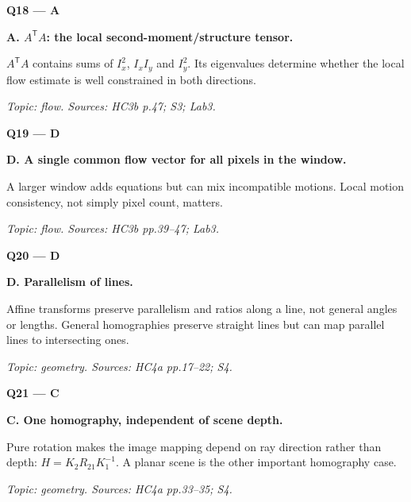 \documentclass[11pt,a4paper]{article}
\begin{document}
\par\vspace{12pt}
\begin{minipage}{\linewidth}
\textbf{Q18 — A}\par\smallskip
\textbf{A. \(A^{\mathsf T}A\): the local second-moment/\allowbreak{}structure tensor.}\par
\(A^{\mathsf T}A\) contains sums of \(I_x^2\),\allowbreak{} \(I_x I_y\) and \(I_y^2\). Its eigenvalues determine whether the local flow estimate is well constrained in both directions.\par
{\small\itshape Topic: flow. Sources: HC3b p.47; S3; Lab3.}

\end{minipage}
\par\vspace{12pt}
\begin{minipage}{\linewidth}
\textbf{Q19 — D}\par\smallskip
\textbf{D. A single common flow vector for all pixels in the window.}\par
A larger window adds equations but can mix incompatible motions. Local motion consistency,\allowbreak{} not simply pixel count,\allowbreak{} matters.\par
{\small\itshape Topic: flow. Sources: HC3b pp.39–47; Lab3.}

\end{minipage}
\par\vspace{12pt}
\begin{minipage}{\linewidth}
\textbf{Q20 — D}\par\smallskip
\textbf{D. Parallelism of lines.}\par
Affine transforms preserve parallelism and ratios along a line,\allowbreak{} not general angles or lengths. General homographies preserve straight lines but can map parallel lines to intersecting ones.\par
{\small\itshape Topic: geometry. Sources: HC4a pp.17–22; S4.}

\end{minipage}
\par\vspace{12pt}
\begin{minipage}{\linewidth}
\textbf{Q21 — C}\par\smallskip
\textbf{C. One homography,\allowbreak{} independent of scene depth.}\par
Pure rotation makes the image mapping depend on ray direction rather than depth: \(H=K_2 R_{21}K_1^{-1}\). A planar scene is the other important homography case.\par
{\small\itshape Topic: geometry. Sources: HC4a pp.33–35; S4.}

\end{minipage}
\end{document}
